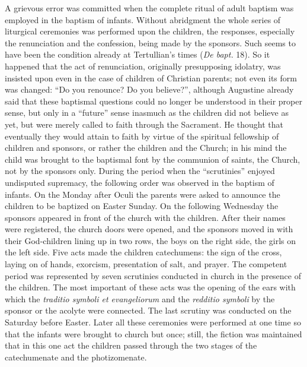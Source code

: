A grievous error was committed when the complete ritual of adult baptism was employed in the baptism of infants. Without abridgment the whole series of liturgical ceremonies was performed upon the children, the responses, especially the renunciation and the confession, being made by the sponsors. Such seems to have been the condition already at Tertullian’s times (\emph{De bapt.} 18). So it happened that the act of renunciation, originally presupposing idolatry, was insisted upon even in the case of children of Christian parents; not even its form was changed: “Do you renounce? Do you believe?”, although Augustine already said that these baptismal questions could no longer be understood in their proper sense, but only in a “future” sense inasmuch as the children did not believe as yet, but were merely called to faith through the Sacrament. He thought that eventually they would attain to faith by virtue of the spiritual fellowship of children and sponsors, or rather the children and the Church; in his mind the child was brought to the baptismal font by the communion of saints, the Church, not by the sponsors only. During the period when the “scrutinies” enjoyed undisputed supremacy, the following order was observed in the baptism of infants. On the Monday after Oculi the parents were asked to announce the children to be baptized on Easter Sunday. On the following Wednesday the sponsors appeared in front of the church with the children. After their names were registered, the church doors were opened, and the sponsors moved in with their God-children lining up in two rows, the boys on the right side, the girls on the left side. Five acts made the children catechumens: the sign of the cross, laying on of hands, exorcism, presentation of salt, and prayer. The
competent period was represented by seven scrutinies conducted in church in the presence of the children. The most important of these acts was the opening of the ears with which the \emph{traditio symboli et evangeliorum} and the \emph{redditio symboli} by the sponsor or the acolyte were connected. The last scrutiny was conducted on the Saturday before Easter. Later all these ceremonies were performed at one time so that the infants were brought to church but once; still, the fiction was maintained that in this one act the children passed through the two stages of the catechumenate and the photizomenate.

